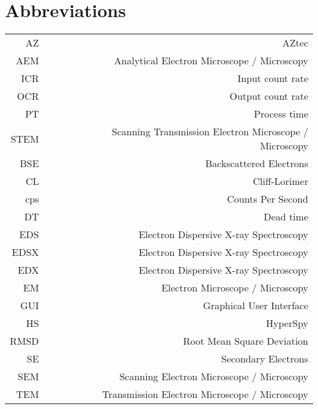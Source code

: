 \chapter*{Abbreviations}

\begin{table}[h!]
    \centering
    \begin{tabular}{rrrr}
        \hline
        AZ   &  &  & AZtec                                                  \\
        AEM  &  &  & Analytical Electron Microscope / Microscopy            \\
        ICR  &  &  & Input count rate                                       \\
        OCR  &  &  & Output count rate                                      \\
        PT   &  &  & Process time                                           \\
        STEM &  &  & Scanning Transmission Electron Microscope / Microscopy \\
        BSE  &  &  & Backscattered Electrons                                \\
        CL   &  &  & Cliff-Lorimer                                          \\
        cps  &  &  & Counts Per Second                                      \\
        DT   &  &  & Dead time                                              \\
        EDS  &  &  & Electron Dispersive X-ray Spectroscopy                 \\
        EDSX &  &  & Electron Dispersive X-ray Spectroscopy                 \\
        EDX  &  &  & Electron Dispersive X-ray Spectroscopy                 \\
        EM   &  &  & Electron Microscope / Microscopy                       \\
        GUI  &  &  & Graphical User Interface                               \\
        HS   &  &  & HyperSpy                                               \\
        RMSD &  &  & Root Mean Square Deviation                             \\
        SE   &  &  & Secondary Electrons                                    \\
        SEM  &  &  & Scanning Electron Microscope / Microscopy              \\
        TEM  &  &  & Transmission Electron Microscope / Microscopy          \\
        \hline
    \end{tabular}
\end{table}

